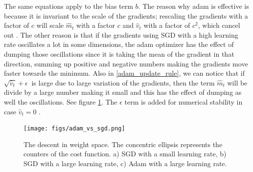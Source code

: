 The same equations apply to the bias term $b$. The reason why adam is effective is because it is invariant to the scale of the gradients; rescaling the gradients with a factor of $c$ will scale $\hat{m}_t$ with a factor $c$ and $\hat{v}_t$ with a factor of $c^2$, which cancel out \cite{adam}.
The other reason is that if the gradients using SGD with a high learning rate oscillates a lot in some dimensions, the adam optimizer has the effect of dumping those oscillations since it is taking the mean of the gradient in that direction, summing up positive and negative numbers making the gradients move faster towards the minimum. Also in \cref{adam_update_rule}, we can notice that if $\sqrt{\hat{v}_t} + \epsilon \ $ is large due to large variation of the gradients, then the term $\hat{m}_t$ will be divide by a large number making it small and this has the effect of dumping as well the oscillations. See figure \cref{adam_vs_SGD}. The $\epsilon$ term is added for numerical stability in case $\hat{v}_t = 0$ \cite{hAN}.

\begin{figure}[H]
  \centering
  \texttt{[image: figs/adam\_vs\_sgd.png]}
  \caption[The descent in weight space]{The descent in weight space. The concentric ellipsis represents the counters of the cost function. a) SGD with a small learning rate, b) SGD with a large learning rate, c) Adam with a large learning rate.}
  \label{adam_vs_SGD}
\end{figure}
